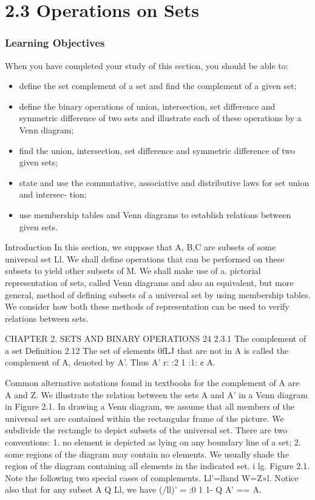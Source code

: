{{%
\section{2.3 Operations on Sets}
\frametitle{Learning Objectives}
When you have completed your study of this section, you should be able to:
\begin{itemize}
\item deﬁne the set complement of a set and ﬁnd the complement of a given set;
\item deﬁne the binary operations of union, intersection, set difference and symmetric difference of
two sets and illustrate each of these operations by a Venn diagram;
\item  ﬁnd the union, intersection, set difference and symmetric difference of two given sets;
\item  state and use the commutative, associative and distributive laws for set union and intersec-
tion;
\item  use membership tables and Venn diagrams to establish relations between given sets.
\end{itemize}

\smallskip 
Introduction
In this section, we suppose that A, B,C are subsets of some universal set Ll. We shall deﬁne
operations that can be performed on these subsets to yield other subsets of M. We shall make
use of a. pictorial representation of sets, called Venn diagrams and also an equivalent, but more
general, method of deﬁning subsets of a universal set by using membership tables. We consider
how both these methods of representation can be used to verify relations between sets.



CHAPTER 2. SETS AND BINARY OPERATIONS 24
2.3.1 The complement of a set
Deﬁnition 2.12 The set of elements 0fLJ that are not in A is called the complement of A,
denoted by A’. Thus
A’ r: {:2 1 :1: ¢ A}.

Common alternative notations found in textbooks for the complement of A are ~ A and Z.
We illustrate the relation between the sets A and A’ in a Venn diagram in Figure 2.1. In drawing a
Venn diagram, we assume that all members of the universal set are contained within the rectangular
frame of the picture. We subdivide the rectangle to depict subsets of the universal set. There are
two conventions:
1. no element is depicted as lying on any boundary line of a set;
2. some regions of the diagram may contain no elements.
We usually shade the region of the diagram containing all elements in the indicated set. 
i
lg.
Figure 2.1.
Note the following two special cases of complements.
Ll'=lland W=Z»l.
Notice also that for any subset A Q Ll, we have
(/ll)’ = {:0 1 1- Q A'} == A.

}}
